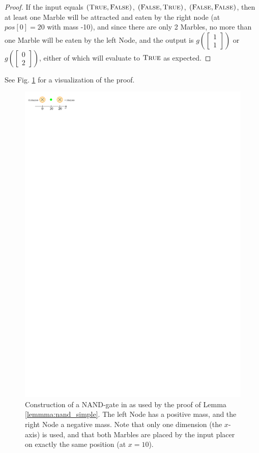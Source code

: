 \begin{proof}
    If the input equals $(\textsc{True}, \textsc{False})$, $(\textsc{False}, \textsc{True})$, $(\textsc{False}, \textsc{False})$, then at least one Marble will be attracted and eaten by the right node (at $pos[0] = 20$ with mass -10), and since there are only 2 Marbles, no more than one Marble will be eaten by the left Node, and the output is $g(\begin{bmatrix}1\\1\end{bmatrix})$ or $g(\begin{bmatrix}0\\2\end{bmatrix})$, either of which will evaluate to $\textsc{True}$ as expected.
\end{proof}
See Fig. \ref{fig:nand_simple} for a visualization of the proof.

\begin{figure}[h]
	\centering
	\includegraphics[scale=1.5]{figures/nand_simple.pdf}
	\caption{Construction of a NAND-gate in \nenwin as used by the proof of Lemma \ref{lemmma:nand_simple}. The left Node has a positive mass, and the right Node a negative mass. Note that only one dimension (the $x$-axis) is used, and that both Marbles are placed by the input placer on exactly the same position (at $x = 10$).}
	\label{fig:nand_simple}
\end{figure}
\clearpage


